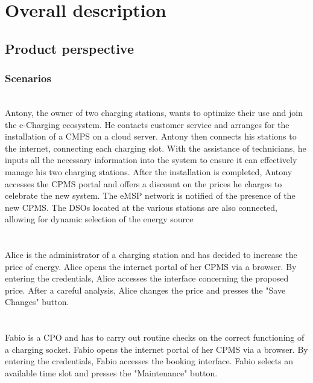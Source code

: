 \chapter{Overall description}
\section{Product perspective}
\subsection{Scenarios}

\begin{enumerate}
	\\
	Antony, the owner of two charging stations, wants to optimize their use and join the e-Charging ecosystem. He contacts customer service and arranges for the installation of a CMPS on a cloud server. Antony then connects his stations to the internet, connecting each charging slot. With the assistance of technicians, he inputs all the necessary information into the system to ensure it can effectively manage his two charging stations. After the installation is completed, Antony accesses the CPMS portal and offers a discount on the prices he charges to celebrate the new system. The eMSP network is notified of the presence of the new CPMS. The DSOs located at the various stations are also connected, allowing for dynamic selection of the energy source\\\\
	
	\\
	Alice is the administrator of a charging station and has decided to increase the price of energy. Alice opens the internet portal of her CPMS via a browser. By entering the credentials, Alice accesses the interface concerning the proposed price. After a careful analysis, Alice changes the price and presses the "Save Changes" button.\\\\
	
	\\
	Fabio is a CPO and has to carry out routine checks on the correct functioning of a charging socket. Fabio opens the internet portal of her CPMS via a browser. By entering the credentials, Fabio accesses the booking interface. Fabio selects an available time slot and presses the "Maintenance" button.\\
	

\end{enumerate}
